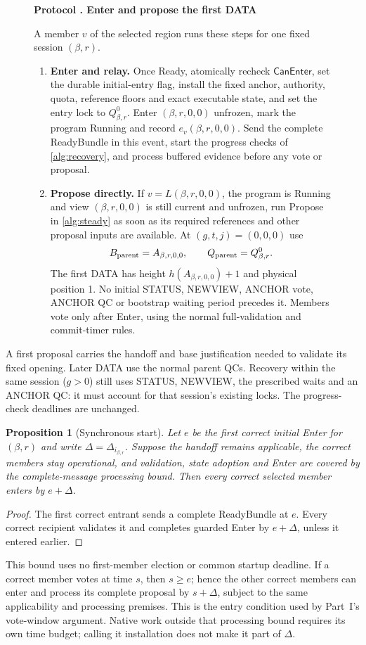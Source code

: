 \documentclass[11pt,a4paper]{article}
\newcommand{\tagg}[1]{\ensuremath{\mathsf{#1}}}
\newtheorem{proposition}[proposition]{Proposition}
\newcounter{protocol}
\newenvironment{protocol}[3][htbp]{\begin{figure}[#1]\refstepcounter{protocol}\label{#2}
\begin{mdframed}[linewidth=.6pt,skipabove=0pt,skipbelow=0pt,
innertopmargin=7pt,innerbottommargin=7pt]\small
\textbf{Protocol \theprotocol. #3}\par\smallskip}{\end{mdframed}\end{figure}}
\begin{document}
\begin{protocol}[H]{alg:bootstrap}{Enter and propose the first DATA}
A member $v$ of the selected region runs these steps for one fixed
session $(\beta,r)$.
\begin{enumerate}[label=\textbf{\arabic*)},itemsep=3pt]
\item \textbf{Enter and relay.} Once Ready, atomically recheck
\tagg{CanEnter}, set the durable initial-entry flag, install the fixed
anchor, authority, quota, reference floors and exact executable state,
and set the entry lock to $Q^0_{\beta,r}$. Enter $(\beta,r,0,0)$
unfrozen, mark the program Running and record $e_v(\beta,r,0,0)$.
Send the complete ReadyBundle in this event, start the progress checks
of \cref{alg:recovery}, and process buffered evidence before any vote
or proposal.
\item \textbf{Propose directly.} If $v=L(\beta,r,0,0)$, the program is
Running and view $(\beta,r,0,0)$ is still current and unfrozen,
run Propose in \cref{alg:steady} as soon
as its required references and other proposal inputs are available.
At $(g,t,j)=(0,0,0)$ use
\[
 B_{\rm parent}=A_{\beta,r,0,0},\qquad
 Q_{\rm parent}=Q^0_{\beta,r}.
\]
The first DATA has height $h(A_{\beta,r,0,0})+1$ and physical position
1. No initial STATUS, NEWVIEW, ANCHOR vote, ANCHOR QC or bootstrap
waiting period precedes it. Members vote only after Enter, using the
normal full-validation and commit-timer rules.
\end{enumerate}
\end{protocol}
A first proposal carries the handoff and base justification needed to
validate its fixed opening. Later DATA use the normal parent QCs.
Recovery within the same session ($g>0$) still uses STATUS, NEWVIEW,
the prescribed waits and an ANCHOR QC: it must account for that
session's existing locks. The progress-check deadlines are unchanged.

\begin{proposition}[Synchronous start]
\label{prop:sync-start}
Let $e$ be the first correct initial Enter for $(\beta,r)$ and write
$\Delta=\Delta_{i_{\beta,r}}$. Suppose the handoff remains applicable,
the correct members stay operational, and validation, state adoption
and Enter are covered by the complete-message processing bound.
Then every correct selected member enters by $e+\Delta$.
\end{proposition}
\begin{proof}
The first correct entrant sends a complete ReadyBundle at $e$.
Every correct recipient validates it and completes guarded Enter by
$e+\Delta$, unless it entered earlier.
\end{proof}
This bound uses no first-member election or common startup deadline.
If a correct member votes at time $s$, then $s\ge e$; hence the other
correct members can enter and process its complete proposal by
$s+\Delta$, subject to the same applicability and processing premises.
This is the entry condition used by Part~I's vote-window argument.
Native work outside that processing bound requires its own time budget;
calling it installation does not make it part of $\Delta$.
\end{document}
